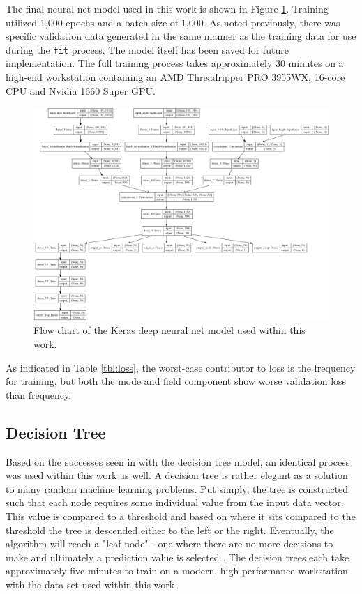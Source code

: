 \documentclass[conference]{IEEEtran}
\begin{document}
The final neural net model used in this work is shown in Figure \ref{fig:model_diagram}.
Training utilized 1,000 epochs and a batch size of 1,000. 
As noted previously, there was specific validation data generated in the same manner as the training data for use during the \verb*|fit| process.
The model itself has been saved for future implementation.
The full training process takes approximately 30 minutes on a high-end workstation containing an AMD Threadripper PRO 3955WX, 16-core CPU and Nvidia 1660 Super GPU. 

\begin{figure}[tp]
	\includegraphics[width=1\linewidth]{images/model_diagram}
	\caption{Flow chart of the Keras deep neural net model used within this work.}
	\label{fig:model_diagram}
\end{figure}

As indicated in Table \ref{tbl:loss}, the worst-case contributor to loss is the frequency for training, but both the mode and field component show worse validation loss than frequency.

\subsection{Decision Tree}

Based on the successes seen in \cite{newberry_machine_2022-1} with the decision tree model, an identical process was used within this work as well.
A decision tree is rather elegant as a solution to many random machine learning problems. 
Put simply, the tree is constructed such that each node requires some individual value from the input data vector.
This value is compared to a threshold and based on where it sits compared to the threshold the tree is descended either to the left or the right. 
Eventually, the algorithm will reach a "leaf node" - one where there are no more decisions to make and ultimately a prediction value is selected \cite{geron_hands-machine_2019}.
The decision trees each take approximately five minutes to train on a modern, high-performance workstation with the data set used within this work.
\end{document}
